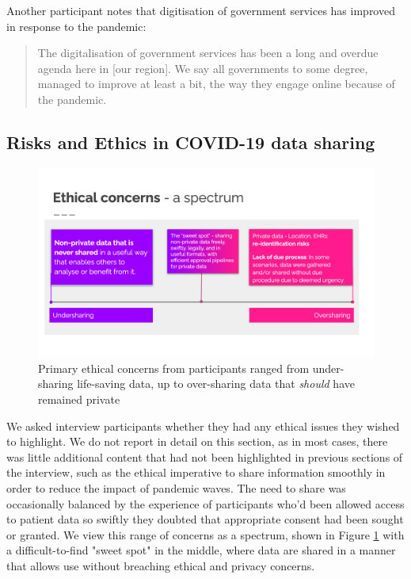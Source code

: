 \documentclass{CUP-JNL-DAP}%
\begin{document}
Another participant notes that digitisation of government services has improved in response to the pandemic: 

\blockquote{The digitalisation of government services has been a long and overdue agenda here in [our region]. We say all governments to some degree, managed to improve at least a bit, the way they engage online because of the pandemic.}

\subsection{Risks and Ethics in COVID-19 data sharing }

\begin{figure}[h!]
    \centering
    \includegraphics[width=1\linewidth]{figures/figure-ethics.png}
    \caption{Primary ethical concerns from participants ranged from under-sharing life-saving data, up to over-sharing data that \textit{should} have remained private}
    \label{fig:fig-ethics}
\end{figure}

We asked interview participants whether they had any ethical issues they wished to highlight. We do not report in detail on this section, as in most cases, there was little additional content that had not been highlighted in previous sections of the interview, such as the ethical imperative to share information smoothly in order to reduce the impact of pandemic waves. The need to share was occasionally balanced by the experience of participants who'd been allowed access to patient data so swiftly they doubted that appropriate consent had been sought or granted. We view this range of concerns as a spectrum, shown in Figure \ref{fig:fig-ethics} with a difficult-to-find "sweet spot" in the middle, where data are shared in a manner that allows use without breaching ethical and privacy concerns.
\end{document}
